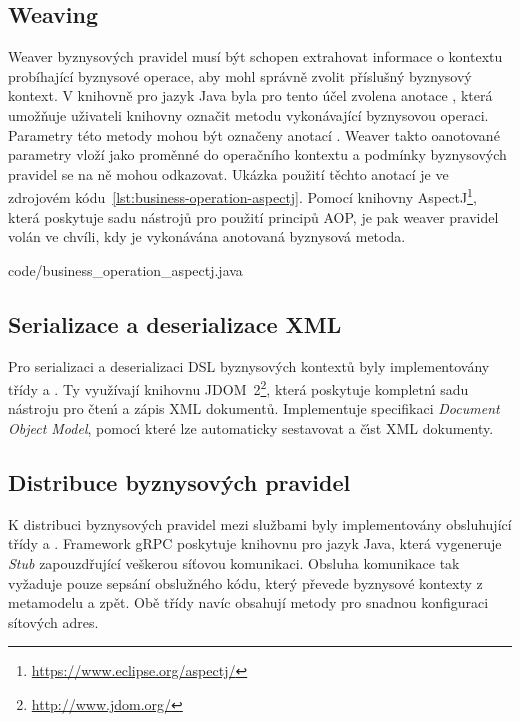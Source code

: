 \subsection{Weaving}

Weaver byznysových pravidel musí být schopen extrahovat informace o kontextu probíhající byznysové
operace, aby mohl správně zvolit příslušný byznysový kontext. V knihovně pro jazyk Java
byla pro tento účel zvolena anotace , která umožňuje uživateli
knihovny označit metodu vykonávající byznysovou operaci. Parametry této metody mohou být
označeny anotací . Weaver takto oanotované parametry vloží
jako proměnné do operačního kontextu a podmínky byznysových pravidel se na ně mohou odkazovat.
Ukázka použití těchto anotací je ve zdrojovém kódu~\ref{lst:business-operation-aspectj}.
Pomocí knihovny AspectJ\footnote{\url{https://www.eclipse.org/aspectj/}}, která poskytuje sadu nástrojů pro použití principů \gls{AOP},
je pak weaver pravidel volán ve chvíli, kdy je vykonávána anotovaná byznysová metoda.


{code/business_operation_aspectj.java}

\subsection{Serializace a deserializace XML}

Pro serializaci a deserializaci \gls{DSL} byznysových kontextů byly implementovány třídy
 a . Ty využívají knihovnu
JDOM~2\footnote{\url{http://www.jdom.org/}}, která poskytuje
kompletn\'{\i} sadu nástroju pro čten\'{\i} a zápis \gls{XML} dokumentů.
Implementuje specifikaci \textit{Document Object Model},
pomoc\'{\i} které lze automaticky sestavovat a č\'{\i}st \gls{XML} dokumenty.

\subsection{Distribuce byznysových pravidel}

K distribuci byznysových pravidel mezi službami byly implementovány obsluhující třídy
 a .
Framework gRPC poskytuje knihovnu pro jazyk Java, která vygeneruje \textit{Stub}
zapouzdřující veškerou síťovou komunikaci. Obsluha komunikace tak vyžaduje pouze
sepsání obslužného kódu, který převede byznysové kontexty z metamodelu a zpět.
Obě třídy navíc obsahují metody pro snadnou konfiguraci sítových adres.

